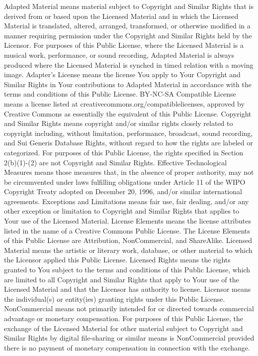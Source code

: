     Adapted Material means material subject to Copyright and Similar Rights that is derived from or based upon the Licensed Material and in which the Licensed Material is translated, altered, arranged, transformed, or otherwise modified in a manner requiring permission under the Copyright and Similar Rights held by the Licensor. For purposes of this Public License, where the Licensed Material is a musical work, performance, or sound recording, Adapted Material is always produced where the Licensed Material is synched in timed relation with a moving image.
    Adapter's License means the license You apply to Your Copyright and Similar Rights in Your contributions to Adapted Material in accordance with the terms and conditions of this Public License.
    BY-NC-SA Compatible License means a license listed at creativecommons.org/compatiblelicenses, approved by Creative Commons as essentially the equivalent of this Public License.
    Copyright and Similar Rights means copyright and/or similar rights closely related to copyright including, without limitation, performance, broadcast, sound recording, and Sui Generis Database Rights, without regard to how the rights are labeled or categorized. For purposes of this Public License, the rights specified in Section 2(b)(1)-(2) are not Copyright and Similar Rights.
    Effective Technological Measures means those measures that, in the absence of proper authority, may not be circumvented under laws fulfilling obligations under Article 11 of the WIPO Copyright Treaty adopted on December 20, 1996, and/or similar international agreements.
    Exceptions and Limitations means fair use, fair dealing, and/or any other exception or limitation to Copyright and Similar Rights that applies to Your use of the Licensed Material.
    License Elements means the license attributes listed in the name of a Creative Commons Public License. The License Elements of this Public License are Attribution, NonCommercial, and ShareAlike.
    Licensed Material means the artistic or literary work, database, or other material to which the Licensor applied this Public License.
    Licensed Rights means the rights granted to You subject to the terms and conditions of this Public License, which are limited to all Copyright and Similar Rights that apply to Your use of the Licensed Material and that the Licensor has authority to license.
    Licensor means the individual(s) or entity(ies) granting rights under this Public License.
    NonCommercial means not primarily intended for or directed towards commercial advantage or monetary compensation. For purposes of this Public License, the exchange of the Licensed Material for other material subject to Copyright and Similar Rights by digital file-sharing or similar means is NonCommercial provided there is no payment of monetary compensation in connection with the exchange.
